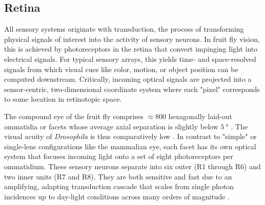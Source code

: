 
\subsection{Retina}
All sensory systems originate with transduction, the process of transforming physical signals of interest into the activity of sensory neurons. In fruit fly vision, this is achieved by photoreceptors in the retina that convert impinging light into electrical signals. For typical sensory arrays, this yields time- and space-resolved signals from which visual cues like color, motion, or object position can be computed downstream. Critically, incoming optical signals are projected into a sensor-centric, two-dimensional coordinate system where each "pixel" corresponds to some location in retinotopic space.

The compound eye of the fruit fly comprises $\approx 800$ hexagonally laid-out ommatidia or facets whose average axial separation is slightly below $\SI{5}{\degree}$ \citep[for a detailed map of the somewhat inhomogeneous fruit fly eye, as compiled by Erich Buchner, see][]{Heisenberg:1984aa}. The visual acuity of \textit{Drosophila} is thus comparatively low \citep{Land:1997aa}. In contrast to "simple" or single-lens configurations like the mammalian eye, each facet has its own optical system that focuses incoming light onto a set of eight photoreceptors per ommatidium. These sensory neurons separate into six outer (R1 through R6) and two inner units (R7 and R8). They are both sensitive and fast due to an amplifying, adapting transduction cascade that scales from single photon incidences up to day-light conditions across many orders of magnitude \citep{Hardie:2001aa,Hardie:2015aa}.


